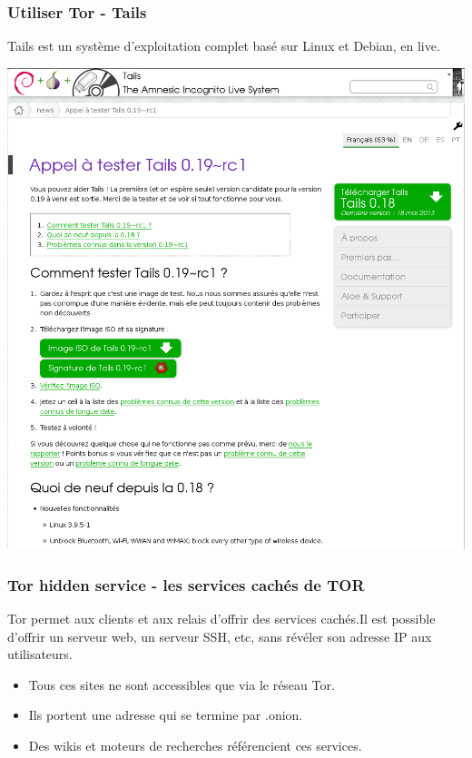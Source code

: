 \begin{frame}
\frametitle{Utiliser Tor - Tails}

Tails est un système d'exploitation complet basé sur Linux et Debian, en live.
\begin{center}
\includegraphics[keepaspectratio,width=\textwidth, height=.8\textheight]{./materials/tails}
\end{center}
\end{frame}

\begin{frame}
\frametitle{Tor hidden service - les services cachés de TOR}

Tor permet aux clients et aux relais d’offrir des services cachés.Il est possible d'offrir un serveur web, un serveur SSH, etc, sans révéler son adresse IP aux utilisateurs.
\begin{itemize}
\item Tous ces sites ne sont accessibles que via le réseau Tor.
\item Ils portent une adresse qui se termine par .onion.
\item Des wikis et moteurs de recherches référencient ces services.
\end{itemize}
\end{frame}

